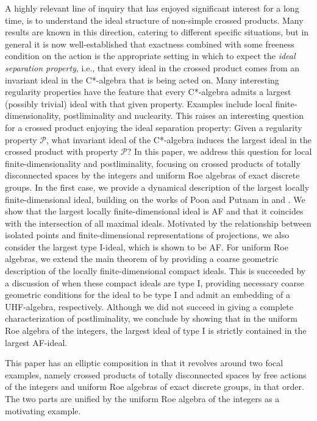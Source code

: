 \documentclass[12pt, a4paper, oneside]{amsart}
\newcommand{\0}{\mathbf{0}}
\newcommand{\1}{\mathbf{1}}
\renewcommand{\P}{\mathcal{P}} %
\begin{document}
	 A highly relevant line of inquiry that has enjoyed significant interest for a long time, is to understand the ideal structure of non-simple crossed products. Many results are known in this direction, catering to different specific situations, but in general it is now well-established that exactness combined with some freeness condition on the action is the appropriate setting in which to expect the \textit{ideal separation property}, i.e., that every ideal in the crossed product comes from an invariant ideal in the C*-algebra that is being acted on. Many interesting regularity properties have the feature that every C*-algebra admits a largest (possibly trivial) ideal with that given property. Examples include local finite-dimensionality, postliminality and nuclearity. This raises an interesting question for a crossed product enjoying the ideal separation property: Given a regularity property \(\P\), what invariant ideal of the C*-algebra induces the largest ideal in the crossed product with property \(\P\)? In this paper, we address this question for local finite-dimensionality and postliminality, focusing on crossed products of totally disconnected spaces by the integers and uniform Roe algebras of exact discrete groups. In the first case, we provide a dynamical description of the largest locally finite-dimensional ideal, building on the works of Poon and Putnam in \cite{poon} and \cite{putnam}. We show that the largest locally finite-dimensional ideal is AF and that it coincides with the intersection of all maximal ideals. Motivated by the relationship between isolated points and finite-dimensional representations of projections, we also consider the largest type I-ideal, which is shown to be AF. For uniform Roe algebras, we extend the main theorem of \cite{li2018low} by providing a coarse geometric description of the locally finite-dimensional compact ideals. This is succeeded by a discussion of when these compact ideals are type I, providing necessary coarse geometric conditions for the ideal to be type I and admit an embedding of a UHF-algebra, respectively. Although we did not succeed in giving a complete characterization of postliminality, we conclude by showing that in the uniform Roe algebra of the integers, the largest ideal of type I is strictly contained in the largest AF-ideal. 

	This paper has an elliptic composition in that it revolves around two focal examples, namely crossed products of totally disconnected spaces by free actions of the integers and uniform Roe algebras of exact discrete groups, in that order. The two parts are unified by the uniform Roe algebra of the integers as a motivating example. 
	
\end{document}
